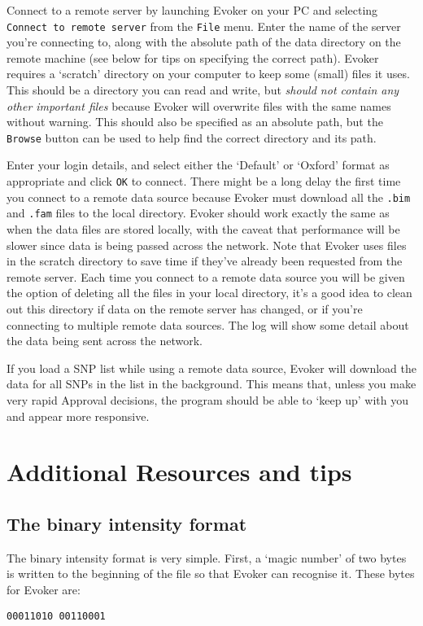 \documentclass{article}
\begin{document}
Connect to a remote server by launching Evoker on your PC and selecting \texttt{Connect to remote server} from the \texttt{File} menu. Enter the name of the server you're connecting to, along with the absolute path of the data directory on the remote machine (see below for tips on specifying the correct path). Evoker requires a `scratch' directory on your computer to keep some (small) files it uses. This should be a directory you can read and write, but \emph{should not contain any other important files} because Evoker will overwrite files with the same names without warning. This should also be specified as an absolute path, but the \texttt{Browse} button can be used to help find the correct directory and its path.

Enter your login details, and select either the `Default' or `Oxford' format as appropriate and click \texttt{OK} to connect. There might be a long delay the first time you connect to a remote data source because Evoker must download all the \texttt{.bim} and \texttt{.fam} files to the local directory. Evoker should work exactly the same as when the data files are stored locally, with the caveat that performance will be slower since data is being passed across the network. Note that Evoker uses files in the scratch directory to save time if they've already been requested from the remote server. Each time you connect to a remote data source you will be given the option of deleting all the files in your local directory, it's a good idea to clean out this directory if data on the remote server has changed, or if you're connecting to multiple remote data sources. The log will show some detail about the data being sent across the network.

If you load a SNP list while using a remote data source, Evoker will download the data for all SNPs in the list in the background. This means that, unless you make very rapid Approval decisions, the program should be able to `keep up' with you and appear more responsive.

\section{Additional Resources and tips}

\subsection{The binary intensity format}

The binary intensity format is very simple. First, a `magic number' of two bytes is written to the beginning of the file so that Evoker can recognise it. These bytes for Evoker are:
\begin{verbatim}
00011010 00110001
\end{verbatim}
\end{document}
